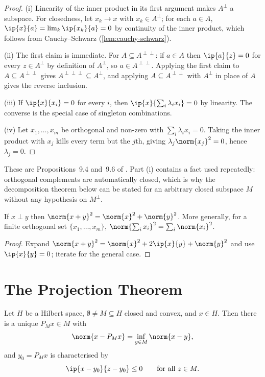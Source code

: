 \begin{proof}
	(i) Linearity of the inner product in its first argument makes $A^{\perp}$ a
	subspace. For closedness, let $x_k\to x$ with $x_k\in A^{\perp}$; for each
	$a\in A$, $\ip{x}{a}=\lim_k\ip{x_k}{a}=0$ by continuity of the inner product,
	which follows from Cauchy--Schwarz (\autoref{lem:cauchy-schwarz}).

	(ii) The first claim is immediate. For $A\subseteq A^{\perp\perp}$: if $a\in A$
	then $\ip{a}{z}=0$ for every $z\in A^{\perp}$ by definition of $A^{\perp}$, so
	$a\in A^{\perp\perp}$. Applying the first claim to
	$A\subseteq A^{\perp\perp}$ gives $A^{\perp\perp\perp}\subseteq A^{\perp}$, and
	applying $A\subseteq A^{\perp\perp}$ with $A^{\perp}$ in place of $A$ gives the
	reverse inclusion.

	(iii) If $\ip{x}{x_i}=0$ for every $i$, then $\ip{x}{\sum_i\lambda_ix_i}=0$ by
	linearity. The converse is the special case of singleton combinations.

	(iv) Let $x_1,\dots,x_m$ be orthogonal and non-zero with
	$\sum_i\lambda_ix_i=0$. Taking the inner product with $x_j$ kills every term but
	the $j$th, giving $\lambda_j\norm{x_j}^2=0$, hence $\lambda_j=0$.
\end{proof}

These are Propositions~9.4 and~9.6 of \textcite[pp.~299--301]{fukuda2026notes}.
Part (i) contains a fact used repeatedly: orthogonal complements are
automatically closed, which is why the decomposition theorem below can be stated
for an arbitrary closed subspace $M$ without any hypothesis on $M^{\perp}$.

\begin{proposition}[Pythagoras]\label{prop:pythagoras}
	If $x\perp y$ then $\norm{x+y}^2=\norm{x}^2+\norm{y}^2$. More generally, for a
	finite orthogonal set $\{x_1,\dots,x_m\}$,
	$\norm{\sum_ix_i}^2=\sum_i\norm{x_i}^2$.
\end{proposition}

\begin{proof}
	Expand $\norm{x+y}^2=\norm{x}^2+2\ip{x}{y}+\norm{y}^2$ and use $\ip{x}{y}=0$;
	iterate for the general case.
\end{proof}

\section{The Projection Theorem}\label{sec:proj-theorem}

\begin{theorem}\label{thm:projection-convex}
	Let $H$ be a Hilbert space, $\emptyset\neq M\subseteq H$ closed and convex, and
	$x\in H$. Then there is a unique $P_Mx\in M$ with
	\[
		\norm{x-P_Mx}=\inf_{y\in M}\norm{x-y},
	\]
	and $y_0=P_Mx$ is characterised by
	\begin{equation}\label{eq:proj-variational}
		\ip{x-y_0}{z-y_0}\leq0\qquad\text{for all }z\in M .
	\end{equation}
\end{theorem}


